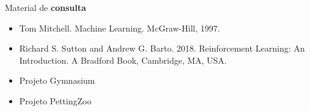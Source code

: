\documentclass{beamer}
\begin{document}
%	
%	
%	
%	
%
%
%
%
%
%
%
%

\begin{frame}{Material de \textbf{consulta}}
\begin{itemize}
  \item Tom Mitchell. Machine Learning. McGraw-Hill, 1997.
  \item Richard S. Sutton and Andrew G. Barto. 2018. Reinforcement Learning: An Introduction. A Bradford Book, Cambridge, MA, USA.
  \item Projeto Gymnasium \href{https://gymnasium.farama.org/}{}
  \item Projeto PettingZoo \href{https://pettingzoo.farama.org/}{}
\end{itemize}
\end{frame}
\end{document}

